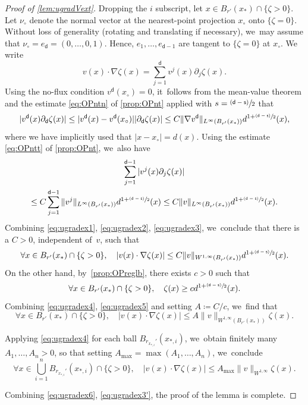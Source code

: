 \documentclass[10pt]{amsart}
\newcommand{\psfrac}[2]{\sfrac{(#1)}{#2}}
\theoremstyle{plain}
\theoremstyle{definition}
\let\nab\nabla
\let\p\partial
\renewcommand{\d}{\mathsf{d}}
\newcommand{\s}{\mathsf{s}}
\begin{document}
\begin{proof}[Proof of \cref{lem:ugradVext}]
Dropping the $i$ subscript, let $x\in B_{r'}(x_*) \cap \{\zeta>0\}$. Let $\nu_\circ$ denote the normal vector at the nearest-point projection $x_\circ$ onto $\{\zeta=0\}$. Without loss of generality (rotating and translating if necessary), we~may assume that $\nu_\circ = e_{\d} = (0,\ldots,0,1)$. Hence, $e_{1},\ldots,e_{\d-1}$ are tangent to $\{\zeta=0\}$ at $x_\circ$. We write
\begin{equation}\label{eq:ugradex1}
v(x)\cdot\nab\zeta(x) = \sum_{j=1}^\d v^j(x)\p_j\zeta(x).
\end{equation}
Using the no-flux condition $v^\d(x_\circ) = 0$, it~follows from the mean-value theorem and the estimate \eqref{eq:OPntn} of \cref{prop:OPnt} {applied with $s= \psfrac{\d-\s}{2}$} that
\begin{equation}\label{eq:ugradex2}
|v^\d(x)\p_\d\zeta(x)| \le |v^\d(x)-v^\d(x_\circ)| |\p_\d\zeta(x)| \le C\|\nab v^\d\|_{L^\infty(B_{r'}(x_*))}d^{1+\psfrac{\d-\s}{2}}(x),
\end{equation}
where we have implicitly used that $|x-x_\circ| = d(x)$. Using the estimate \eqref{eq:OPntt} of \cref{prop:OPnt}, we~also have
\begin{multline}\label{eq:ugradex3}
\sum_{j=1}^{\d-1} |v^j(x)\p_j\zeta(x)|\\
\le C\sum_{j=1}^{\d-1} \|v^j\|_{L^\infty(B_{r'}(x_*))} d^{1+\psfrac{\d-\s}{2}}(x) \le C\|v\|_{L^\infty(B_{r'}(x_*))} d^{1+\psfrac{\d-\s}{2}}(x).
\end{multline}
Combining \eqref{eq:ugradex1}, \eqref{eq:ugradex2}, \eqref{eq:ugradex3}, we~conclude that there is a $C>0$, independent of~$v$, such that
\begin{equation}\label{eq:ugradex4}
\forall x\in B_{r'}(x_*) \cap \{\zeta >0\}, \quad |v(x)\cdot\nab\zeta(x)| \le C\|v\|_{W^{1,\infty}(B_{r'}(x_*))} d^{1+\psfrac{\d-\s}{2}}(x).
\end{equation}
On the other hand, by~\cref{prop:OPreglb}, there exists $c>0$ such that
\begin{equation}\label{eq:ugradex5}
\forall x\in B_{r'}(x_*) \cap \{\zeta >0\}, \quad \zeta(x) \ge c d^{1+\psfrac{\d-\s}{2}}(x).
\end{equation}
Combining \eqref{eq:ugradex4}, \eqref{eq:ugradex5} {and setting $A\coloneqq C/c$}, we~find that
\begin{equation*}
\forall x\in B_{r'}(x_*) \cap \{\zeta >0\}, \quad |v(x)\cdot\nab\zeta(x)| \le A\|v\|_{W^{1,\infty}(B_{r'}(x_*))}\zeta(x).
\end{equation*}

Applying \eqref{eq:ugradex4} for each ball $B_{r_{x_{*,i}}'}(x_{*,i})$, we~obtain finitely many $A_1,\ldots,A_n>0$, so that setting $A_{\max} = \max(A_1,\ldots,A_n)$, we~conclude
\begin{equation}\label{eq:ugradex6}
\forall x\in \bigcup_{i=1}^n B_{r_{x_{*,i}}'}(x_{*,i}) \cap \{\zeta>0\}, \quad |v(x)\cdot\nab\zeta(x)| \le A_{\max}\|v\|_{W^{1,\infty}} \zeta(x).
\end{equation}

Combining \eqref{eq:ugradex6}, \eqref{eq:ugradex3'}, the proof of the lemma is complete.
\end{proof}
\end{document}

